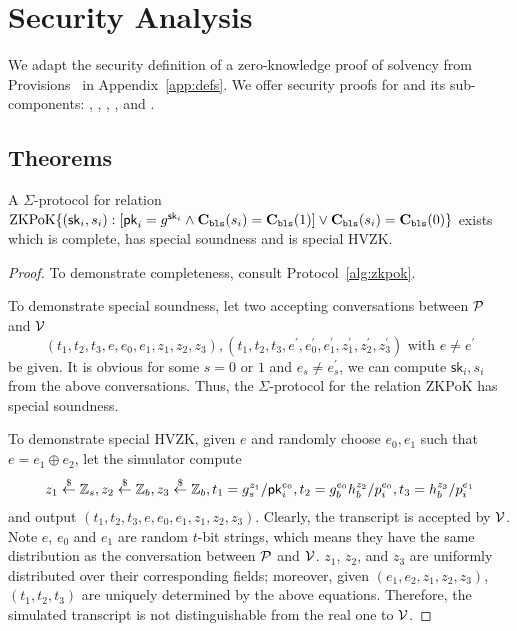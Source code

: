 \chapter{Security Analysis}
\label{sec:proof}

We adapt the security definition of a zero-knowledge proof of solvency from Provisions~\cite{provisions} in Appendix~\ref{app:defs}. We offer security proofs for \Sys and its sub-components: \bootstrap, \userproof, \pol, \poa, and \pos.

\section{Theorems}


\begin{theorem}
\label{thm:sigmaclaim}
A $\Sigma$-protocol for relation $\mathrm{ZKPoK}\{(\mathsf{sk}_i,s_i):[\mathsf{pk}_i=g^{\mathsf{sk}_i}\land{\textbf{C}_\texttt{bls}(s_i)}=\textbf{C}_\texttt{bls}(1)] \lor{\textbf{C}_\texttt{bls}(s_i)}=\textbf{C}_\texttt{bls}(0)\}$ exists which is complete, has special soundness and is special HVZK. 
\end{theorem}

\begin{proof}
To demonstrate completeness, consult Protocol~\ref{alg:zkpok}.

To demonstrate special soundness, let two accepting conversations between $\mathcal{P}$ and $\mathcal{V}$
$$
(t_1,t_2,t_3,e,e_0,e_1,z_1,z_2,z_3),(t_1,t_2,t_3,e^\prime,e_0^\prime,e_1^\prime,z_1^\prime,z_2^\prime,z_3^\prime)\text{ with $e\ne{e^\prime}$}
$$
be given. It is obvious for some $s=0$ or $1$ and $e_s\ne{e_s^\prime}$, we can compute $\mathsf{sk}_i,s_i$ from the above conversations. Thus, the $\Sigma$-protocol for the relation $\mathrm{ZKPoK}$ has special soundness.

To demonstrate special HVZK, given $e$ and randomly choose $e_0,e_1$ such that $e=e_1\oplus{e_2}$, let the simulator compute
$$
z_1\stackrel{\$}{\leftarrow}\mathbb{Z}_s,z_2\stackrel{\$}{\leftarrow}\mathbb{Z}_b,z_3\stackrel{\$}{\leftarrow}\mathbb{Z}_b,t_1=g_s^{z_1}/\mathsf{pk}_i^{e_0},t_2=g_b^{e_0}h_b^{z_2}/{p_i^{e_0}},t_3=h_b^{z_3}/{p_i^{e_1}}
$$
and output $(t_1,t_2,t_3,e,e_0,e_1,z_1,z_2,z_3)$. Clearly, the transcript is accepted by $\mathcal{V}$. Note $e$, $e_0$ and $e_1$ are random $t$-bit strings, which means they have the same distribution as the conversation between $\mathcal{P}$ and $\mathcal{V}$. $z_1$, $z_2$, and $z_3$ are uniformly distributed over their corresponding fields; moreover, given $(e_1,e_2,z_1,z_2,z_3)$, $(t_1,t_2,t_3)$ are uniquely determined by the above equations. Therefore, the simulated transcript is not distinguishable from the real one to $\mathcal{V}$.
\end{proof}


